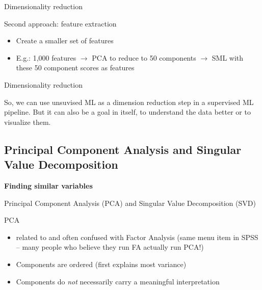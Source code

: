 \documentclass[compress]{beamer}
\begin{document}
\begin{frame}[fragile]{Dimensionality reduction}

\begin{block}{Second approach: feature extraction}
\begin{itemize}
\item Create a smaller set of features
\item E.g.: 1,000 features $\rightarrow$ PCA to reduce to 50 components $\rightarrow$ SML with these 50 component scores as features
\end{itemize}
\end{block}

\end{frame}



\begin{frame}[fragile]{Dimensionality reduction}

So, we can use unsuvised ML as a dimension reduction step in a supervised ML pipeline. 
\vspace{0.5cm}
But it can also be a goal in itself, to understand the data better or to visualize them.
\end{frame}







\subsection{Principal Component Analysis and Singular Value Decomposition}

\begin{frame}[plain]
\textbf{Finding similar variables}

Principal Component Analysis (PCA) and Singular Value Decomposition (SVD)
\end{frame}


\begin{frame}{PCA}
\begin{itemize}
\item related to and often confused with Factor Analysis (same menu item in SPSS -- many people who believe they run FA actually run PCA!)
\item Components are ordered (first explains most variance)
\item Components do \emph{not} necessarily carry a meaningful interpretation
\end{itemize}
\end{frame}
\end{document}
